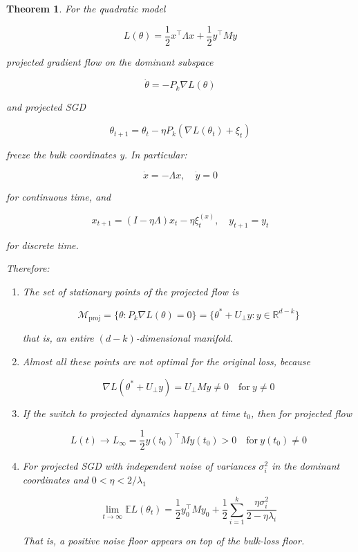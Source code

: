 \documentclass[conference]{IEEEtran}
\newtheorem{theorem}{Theorem}
\begin{document}
\begin{theorem}

    For the quadratic model

    \[
    L(\theta) = \frac{1}{2}x^\top\Lambda x + \frac{1}{2}y^\top My
    \]

    projected gradient flow on the dominant subspace

    \[
    \dot\theta = -P_k\nabla L(\theta)
    \]

    and projected SGD

    \[
    \theta_{t+1} = \theta_t - \eta P_k(\nabla L(\theta_t) + \xi_t)
    \]

    freeze the bulk coordinates y. In particular:

    \[
    \dot x = -\Lambda x, \quad \dot y = 0
    \]

    for continuous time, and

    \[
    x_{t+1} = (I-\eta\Lambda)x_t - \eta\xi_t^{(x)}, \quad y_{t+1} = y_t
    \]

    for discrete time.

    Therefore:

    \begin{enumerate}
        \item The set of stationary points of the projected flow is

        \[
        \mathcal{M}_\text{proj} = \{\theta: P_k\nabla L(\theta) = 0\} = \{\theta^* + U_\bot y: y \in \mathbb{R}^{d-k}\}
        \]

        that is, an entire $(d-k)$-dimensional manifold.

        \item Almost all these points are not optimal for the original loss, because

        \[
        \nabla L(\theta^* + U_\bot y) = U_\bot M y \ne 0\quad \text{for}\ y\ne 0
        \]
        
        \item If the switch to projected dynamics happens at time $t_0$, then for projected flow

        \[
        L(t)\to L_\infty = \frac{1}{2}y(t_0)^\top M y(t_0) > 0\quad \text{for}\ y(t_0)\ne 0
        \]

        \item For projected SGD with independent noise of variances $\sigma_i^2$ in the dominant coordinates and $0 < \eta < 2/\lambda_1$

        \[
        \lim_{t\to\infty}\mathbb{E}L(\theta_t) = \frac{1}{2}y_0^\top My_0 + \frac{1}{2}\sum_{i=1}^k \frac{\eta\sigma_i^2}{2-\eta \lambda_i}
        \]

        That is, a positive noise floor appears on top of the bulk-loss floor.
    \end{enumerate}
    
\end{theorem}
\end{document}

